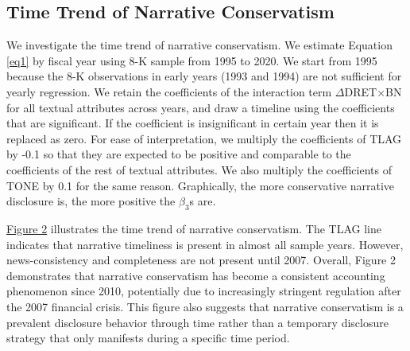 \documentclass[letterpaper,12pt]{article}
\begin{document}
\begin{spacing}{1.5}
\subsection{Time Trend of Narrative Conservatism}
We investigate the time trend of narrative conservatism. We estimate Equation \eqref{eq1} by fiscal year using 8-K sample from 1995 to 2020. We start from 1995 because the 8-K observations in early years (1993 and 1994) are not sufficient for yearly regression. We retain the coefficients of the interaction term $\Delta$DRET$\times$BN for all textual attributes across years, and draw a timeline using the coefficients that are significant. If the coefficient is insignificant in certain year then it is replaced as zero. For ease of interpretation, we multiply the coefficients of TLAG by -0.1 so that they are expected to be positive and comparable to the coefficients of the rest of textual attributes. We also multiply the coefficients of TONE by 0.1 for the same reason. Graphically, the more conservative narrative disclosure is, the more positive the $\beta_3$s are.

\hyperref[fig2]{Figure 2} illustrates the time trend of narrative conservatism. The TLAG line indicates that narrative timeliness is present in almost all sample years. However, news-consistency and completeness are not present until 2007. Overall, Figure 2 demonstrates that narrative conservatism has become a consistent accounting phenomenon since 2010, potentially due to increasingly stringent regulation after the 2007 financial crisis. This figure also suggests that narrative conservatism is a prevalent disclosure behavior through time rather than a temporary disclosure strategy that only manifests during a specific time period.

\begin{comment}

\end{comment}
\end{spacing}
\end{document}
